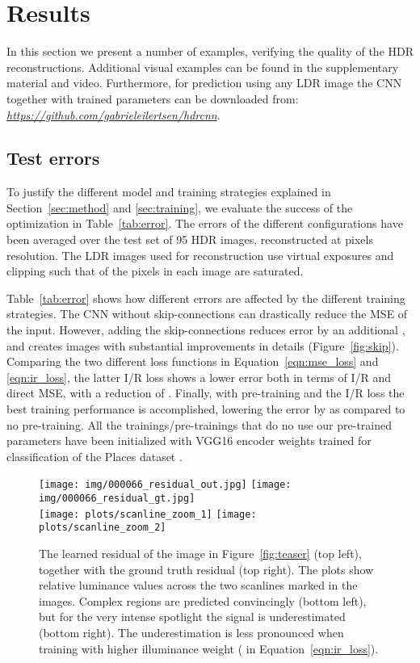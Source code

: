 \documentclass[acmtog]{acmart}
\newcommand{\figref}[1]{Figure~\ref{fig:#1}}
\newcommand{\tabref}[1]{Table~\ref{tab:#1}}
\newcommand{\eqnref}[1]{Equation~\ref{eqn:#1}}
\newcommand{\secref}[1]{Section~\ref{sec:#1}}
\newcommand\belowfigspace{-2pt}
\newcommand\customsection[1]{\subsection{#1}}
\begin{document}
\section{Results}
In this section we present a number of examples, verifying the quality of the HDR reconstructions. Additional visual examples can be found in the supplementary material and video. Furthermore, for prediction using any LDR image the CNN together with trained parameters can be downloaded from: {\it\url{https://github.com/gabrieleilertsen/hdrcnn}}.

\customsection{Test errors}
To justify the different model and training strategies explained in \secref{method} and \ref{sec:training}, we evaluate the success of the optimization in \tabref{error}. The errors of the different configurations have been averaged over the test set of 95 HDR images, reconstructed at  pixels resolution. The LDR images used for reconstruction use virtual exposures and clipping such that  of the pixels in each image are saturated. 

\tabref{error} shows how different errors are affected by the different training strategies. The CNN without skip-connections can drastically reduce the MSE of the input. However, adding the skip-connections reduces error by an additional , and creates images with substantial improvements in details (\figref{skip}). Comparing the two different loss functions in \eqnref{mse_loss} and \ref{eqn:ir_loss}, the latter I/R loss shows a lower error both in terms of I/R and direct MSE, with a reduction of . Finally, with pre-training and the I/R loss the best training performance is accomplished, lowering the error by  as compared to no pre-training. All the trainings/pre-trainings that do no use our pre-trained parameters have been initialized with VGG16 encoder weights trained for classification of the Places dataset \cite{Zhou2014}.

\begin{figure}
	\vspace{5pt}
	\newcommand\ww{0.235}
	\centering
	\texttt{[image: img/000066\_residual\_out.jpg]}
	\texttt{[image: img/000066\_residual\_gt.jpg]}
	\vspace{-2pt}\\
	\texttt{[image: plots/scanline\_zoom\_1]}
	\texttt{[image: plots/scanline\_zoom\_2]}
	\vspace{-7pt}\\
	\caption{\label{fig:residual} The learned residual of the image in \figref{teaser} (top left), together with the ground truth residual (top right). The plots show relative luminance values across the two scanlines marked in the images. Complex regions are predicted convincingly (bottom left), but for the very intense spotlight the signal is underestimated (bottom right). The underestimation is less pronounced when training with higher illuminance weight ( in \eqnref{ir_loss}). }
	\vspace{\belowfigspace}
\end{figure}
\end{document}
